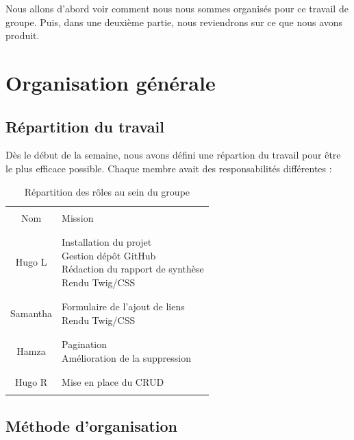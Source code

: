\documentclass[12pt,a4paper]{article}
\begin{document}
Nous allons d'abord voir comment nous nous sommes organisés pour ce travail de groupe. Puis, dans une deuxième partie, nous reviendrons sur ce que nous avons produit.

\section{Organisation générale}

	\subsection{Répartition du travail}
	
	
Dès le début de la semaine, nous avons défini une répartion du travail pour être le plus efficace possible. Chaque membre avait des responsabilités différentes :


\begin{table}[!h]
	\centering
		\begin{tabular}{|c|l|}
			\hline
			& \\
			Nom & Mission \\ 
			& \\\hline
			& \\
			Hugo L & \makecell[l]{Installation du projet \\ Gestion dépôt GitHub \\ Rédaction du rapport de synthèse \\ Rendu Twig/CSS}\\ 
			& \\ \hline
			& \\
			Samantha & \makecell[l]{Formulaire de l'ajout de liens \\ Rendu Twig/CSS} \\ 
			& \\ \hline
			& \\
			Hamza & \makecell[l]{Pagination \\ Amélioration de la suppression }\\ 
			& \\ \hline
			& \\
			Hugo R & Mise en place du CRUD \\ 
			& \\ \hline
		\end{tabular}
	\caption{Répartition des rôles au sein du groupe}
\end{table}	

\newpage
		
	\subsection{Méthode d'organisation}
	
\end{document}
